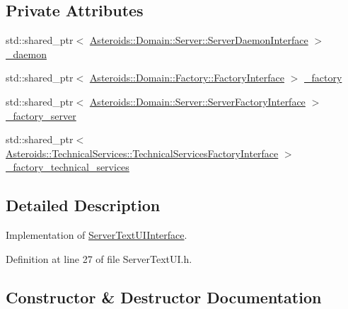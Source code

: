 \subsection*{Private Attributes}
\begin{DoxyCompactItemize}
\item 
std\+::shared\+\_\+ptr$<$ \hyperlink{classAsteroids_1_1Domain_1_1Server_1_1ServerDaemonInterface}{Asteroids\+::\+Domain\+::\+Server\+::\+Server\+Daemon\+Interface} $>$ \hyperlink{classAsteroids_1_1UI_1_1ServerTextUI_1_1ServerTextUI_acd6e888ebaae2720b7ee2c0ba4a48d57}{\+\_\+daemon}
\item 
std\+::shared\+\_\+ptr$<$ \hyperlink{classAsteroids_1_1Domain_1_1Factory_1_1FactoryInterface}{Asteroids\+::\+Domain\+::\+Factory\+::\+Factory\+Interface} $>$ \hyperlink{classAsteroids_1_1UI_1_1ServerTextUI_1_1ServerTextUI_a638ab849164272cccdc65e8fba5a7847}{\+\_\+factory}
\item 
std\+::shared\+\_\+ptr$<$ \hyperlink{classAsteroids_1_1Domain_1_1Server_1_1ServerFactoryInterface}{Asteroids\+::\+Domain\+::\+Server\+::\+Server\+Factory\+Interface} $>$ \hyperlink{classAsteroids_1_1UI_1_1ServerTextUI_1_1ServerTextUI_a67f2dfea480ca44117e086ef03589322}{\+\_\+factory\+\_\+server}
\item 
std\+::shared\+\_\+ptr$<$ \hyperlink{classAsteroids_1_1TechnicalServices_1_1TechnicalServicesFactoryInterface}{Asteroids\+::\+Technical\+Services\+::\+Technical\+Services\+Factory\+Interface} $>$ \hyperlink{classAsteroids_1_1UI_1_1ServerTextUI_1_1ServerTextUI_afec311ead683a6411254d2c6ab96e4af}{\+\_\+factory\+\_\+technical\+\_\+services}
\end{DoxyCompactItemize}


\subsection{Detailed Description}
Implementation of \hyperlink{classAsteroids_1_1UI_1_1ServerTextUI_1_1ServerTextUIInterface}{Server\+Text\+U\+I\+Interface}. 

Definition at line 27 of file Server\+Text\+U\+I.\+h.



\subsection{Constructor \& Destructor Documentation}
\mbox{\label{classAsteroids_1_1UI_1_1ServerTextUI_1_1ServerTextUI_aa66ce6a8f5a8293e564ba7fe5848eee6}} 
